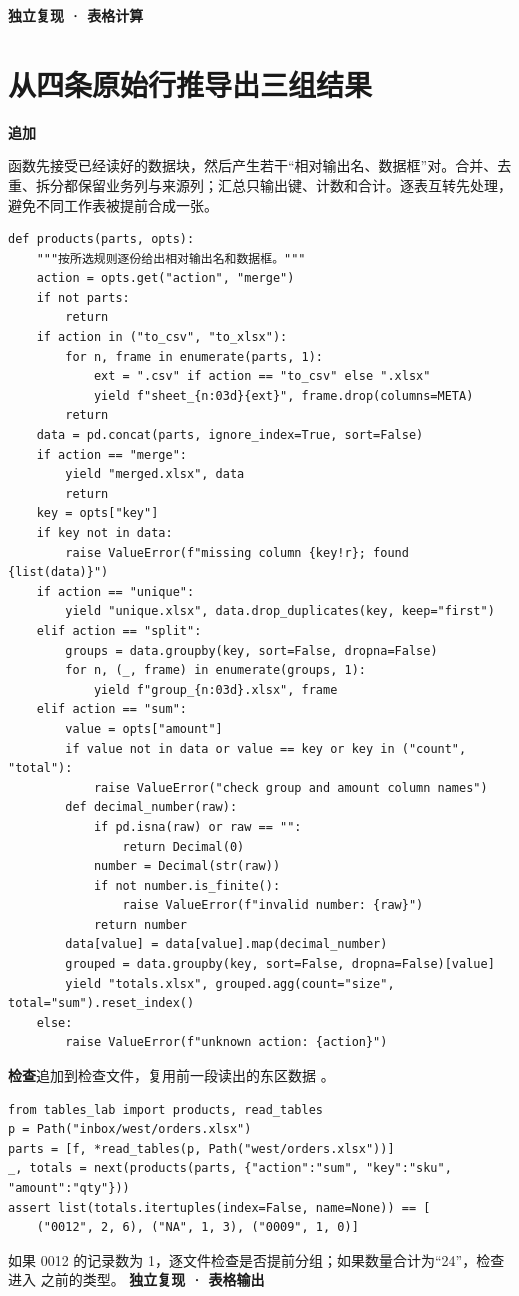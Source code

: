 \documentclass[UTF8,11pt,a4paper,fontset=fandol]{ctexart}
\newcommand{\file}[1]{\texttt{\detokenize{#1}}}
\newcommand{\partlabel}[1]{{\small\bfseries\color{accent}#1}\par}
\newcommand{\stepfile}[2]{\textbf{#1}\quad\file{#2}\par}
\begin{document}
\newpage
\partlabel{独立复现 · 表格计算}
\section{从四条原始行推导出三组结果}\label{lab:transform}
\stepfile{追加}{tables_lab.py}
函数先接受已经读好的数据块，然后产生若干“相对输出名、数据框”对。合并、去重、拆分都保留业务列与来源列；汇总只输出键、计数和合计。逐表互转先处理，避免不同工作表被提前合成一张。
\begin{lstlisting}[style=lab]
def products(parts, opts):
    """按所选规则逐份给出相对输出名和数据框。"""
    action = opts.get("action", "merge")
    if not parts:
        return
    if action in ("to_csv", "to_xlsx"):
        for n, frame in enumerate(parts, 1):
            ext = ".csv" if action == "to_csv" else ".xlsx"
            yield f"sheet_{n:03d}{ext}", frame.drop(columns=META)
        return
    data = pd.concat(parts, ignore_index=True, sort=False)
    if action == "merge":
        yield "merged.xlsx", data
        return
    key = opts["key"]
    if key not in data:
        raise ValueError(f"missing column {key!r}; found {list(data)}")
    if action == "unique":
        yield "unique.xlsx", data.drop_duplicates(key, keep="first")
    elif action == "split":
        groups = data.groupby(key, sort=False, dropna=False)
        for n, (_, frame) in enumerate(groups, 1):
            yield f"group_{n:03d}.xlsx", frame
    elif action == "sum":
        value = opts["amount"]
        if value not in data or value == key or key in ("count", "total"):
            raise ValueError("check group and amount column names")
        def decimal_number(raw):
            if pd.isna(raw) or raw == "":
                return Decimal(0)
            number = Decimal(str(raw))
            if not number.is_finite():
                raise ValueError(f"invalid number: {raw}")
            return number
        data[value] = data[value].map(decimal_number)
        grouped = data.groupby(key, sort=False, dropna=False)[value]
        yield "totals.xlsx", grouped.agg(count="size", total="sum").reset_index()
    else:
        raise ValueError(f"unknown action: {action}")
\end{lstlisting}
\textbf{检查}\quad 追加到检查文件，复用前一段读出的东区数据 \file{f}。
\begin{lstlisting}[style=lab]
from tables_lab import products, read_tables
p = Path("inbox/west/orders.xlsx")
parts = [f, *read_tables(p, Path("west/orders.xlsx"))]
_, totals = next(products(parts, {"action":"sum", "key":"sku", "amount":"qty"}))
assert list(totals.itertuples(index=False, name=None)) == [
    ("0012", 2, 6), ("NA", 1, 3), ("0009", 1, 0)]
\end{lstlisting}
如果 0012 的记录数为 1，逐文件检查是否提前分组；如果数量合计为“24”，检查进入 \file{groupby} 之前的类型。
\newpage
\partlabel{独立复现 · 表格输出}
\end{document}
